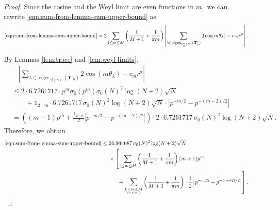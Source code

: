 \documentclass[11pt,letterpaper,reqno]{amsart}
\theoremstyle{definition}
\numberwithin{equation}{section}
\numberwithin{figure}{section}
\numberwithin{table}{section}
\newcommand{\eigen}{\operatorname{eigen}}
\begin{document}
\begin{proof}
    Since the cosine and the Weyl limit are even functions in $m,$ we can rewrite \eqref{eqn:sum-from-lemma-sum-upper-bound} as
\[
\eqref{eqn:sum-from-lemma-sum-upper-bound} =
2\sum_{1\leq m\leq M}
\left(
\frac{1}{M+1}
+
\frac{1}{\pi m}
\right)
\left|
\sum_{\lambda \in \eigen_{S_k^\sigma(N)}(\mathbf{T}'_p)} 2\cos(m\theta_{\lambda})-c_m r^\sigma
\right|.
\]

By Lemmas \ref{lem:trace} and \ref{lem:weyl-limits},
\begin{align*}
    & \quad \left|
\sum_{\lambda \in \eigen_{S_k^\sigma(N)}(\mathbf{T}'_p)} 2\cos(m \theta_\lambda )-c_m r^\sigma
\right| \\
&\leq 2\cdot 6.7261717 \cdot  p^m \sigma_0(p^m) \sigma_0(N)^2 \log(N + 2) \sqrt{N} \\
&\qquad + \mathds{1}_{2 \mid m} \cdot 6.7261717 \,  \sigma_0(N)^2 \log(N + 2) \sqrt{N} \cdot \left| p^{-m/2} - p^{-(m - 2)/2}  \right|  \\
&= \left( (m + 1)p^m  +  \frac{\mathds{1}_{2 \mid m}}{2}\left| p^{-m/2} - p^{-(m - 2)/2}  \right|\right) \cdot 2 \cdot 6.7261717  \,  \sigma_0(N)^2 \log(N + 2) \sqrt{N}.
\end{align*}
Therefore, we obtain
\begin{align}
    \eqref{eqn:sum-from-lemma-sum-upper-bound} &\leq 26.904687 \,\sigma_0(N)^2 \log(N + 2) \sqrt{N}\\
    & \quad\ \times \left[ \sum_{1 \leq m \leq M} \left( \frac{1}{M + 1} + \frac{1}{\pi m} \right) (m + 1)p^m \right. \label{eqn:sum-upper-bound-expression-1}\\
    & \qquad\quad + \left. \sum_{\substack{0 < m \leq M\\ \text{$m$ even}}} \left( \frac{1}{M + 1} + \frac{1}{\pi m} \right) \cdot \frac{1}{2}\left| p^{-m/2} - p^{-(m - 2)/2} \right| \right] . \label{eqn:sum-upper-bound-expression-2}
\end{align}


\end{proof}
\end{document}

